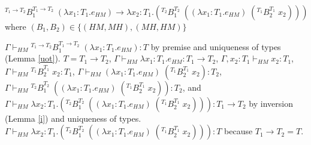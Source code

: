 \begin{case}
$^{T_{1}\rightarrow T_{2}}B_{1}^{T_{1}\rightarrow T_{2}}\;(\lambda x_{1}:T_{1}.e_{HM})\rightarrow\lambda x_{2}:T_{1}.(^{T_{2}}B_{1}^{T_{2}}\;((\lambda x_{1}:T_{1}.e_{HM})\;(^{T_{1}}B_{2}^{T_{1}}\;x_{2})))$ where $(B_{1},B_{2})\in\lbrace(HM,MH),(MH,HM)\rbrace$

$\Gamma\vdash_{HM}{^{T_{1}\rightarrow T_{2}}}B_{1}^{T_{1}\rightarrow T_{2}}\;(\lambda x_{1}:T_{1}.e_{HM}):T$ by premise and uniqueness of types (Lemma \ref{uot}).  $T=T_{1}\rightarrow T_{2}$, $\Gamma\vdash_{HM}\lambda x_{1}:T_{1}.e_{HM}:T_{1}\rightarrow T_{2}$, $\Gamma,x_{2}:T_{1}\vdash_{HM}x_{2}:T_{1}$, $\Gamma\vdash_{HM}{^{T_{1}}B}_{2}^{T_{1}}\;x_{2}:T_{1}$, $\Gamma\vdash_{HM}(\lambda x_{1}:T_{1}.e_{HM})\;(^{T_{1}}B_{2}^{T_{1}}\;x_{2}):T_{2}$, $\Gamma\vdash_{HM}{^{T_{2}}B}_{1}^{T_{2}}\;((\lambda x_{1}:T_{1}.e_{HM})\;(^{T_{1}}B_{2}^{T_{1}}\;x_{2})):T_{2}$, and $\Gamma\vdash_{HM}\lambda x_{2}:T_{1}.(^{T_{2}}B_{1}^{T_{2}}\;((\lambda x_{1}:T_{1}.e_{HM})\;(^{T_{1}}B_{2}^{T_{1}}\;x_{2}))):T_{1}\rightarrow T_{2}$ by inversion (Lemma \ref{i}) and uniqueness of types.  $\Gamma\vdash_{HM}\lambda x_{2}:T_{1}.(^{T_{2}}B_{1}^{T_{2}}\;((\lambda x_{1}:T_{1}.e_{HM})\;(^{T_{1}}B_{2}^{T_{1}}\;x_{2}))):T$ because $T_{1}\rightarrow T_{2}=T$.
\end{case}